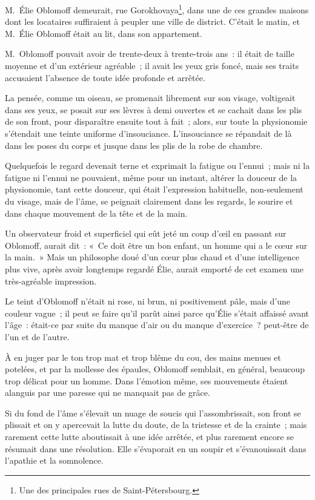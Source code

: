 \documentclass[french,twoside]{book} %
\begin{document}
\noindent M. Élie Oblomoff demeurait, rue Gorokhovaya\footnote{Une des principales rues de Saint-Pétersbourg.}, dans une de ces grandes maisons dont les locataires suffiraient à peupler une ville de district. C’était le matin, et M. Élie Oblomoff était au lit, dans son appartement.\par
M. Oblomoff pouvait avoir de trente-deux à trente-trois ans : il était de taille moyenne et d’un extérieur agréable ; il avait les yeux gris foncé, mais ses traits accusaient l’absence de toute idée profonde et arrêtée.\par
La pensée, comme un oiseau, se promenait librement sur son visage, voltigeait dans ses yeux, se posait sur ses lèvres à demi ouvertes et se cachait dans les plis de son front, pour disparaître ensuite tout à fait ; alors, sur toute la physionomie s’étendait une teinte uniforme d’insouciance. L’insouciance se répandait de là dans les poses du corps et jusque dans les plis de la robe de chambre.\par
Quelquefois le regard devenait terne et exprimait la fatigue ou l’ennui ; mais ni la fatigue ni l’ennui ne pouvaient, même pour un instant, altérer la douceur de la physionomie, tant cette douceur, qui était l’expression habituelle, non-seulement du visage, mais de l’âme, se peignait clairement dans les regards, le sourire et dans chaque mouvement de la tête et de la main.\par
Un observateur froid et superficiel qui eût jeté un coup d’œil en passant sur Oblomoff, aurait dit : « Ce doit être un bon enfant, un homme qui a le cœur sur la main. » Mais un philosophe doué d’un cœur plus chaud et d’une intelligence plus vive, après avoir longtemps regardé Élie, aurait emporté de cet examen une très-agréable impression.\par
Le teint d’Oblomoff n’était ni rose, ni brun, ni positivement pâle, mais d’une couleur vague ; il peut se faire qu’il parût ainsi parce qu’Élie s’était affaissé avant l’âge : était-ce par suite du manque d’air ou du manque d’exercice ? peut-être de l’un et de l’autre.\par
À en juger par le ton trop mat et trop blême du cou, des mains menues et potelées, et par la mollesse des épaules, Oblomoff semblait, en général, beaucoup trop délicat pour un homme. Dans l’émotion même, ses mouvements étaient alanguis par une paresse qui ne manquait pas de grâce.\par
Si du fond de l’âme s’élevait un nuage de soucis qui l’assombrissait, son front se plissait et on y apercevait la lutte du doute, de la tristesse et de la crainte ; mais rarement cette lutte aboutissait à une idée arrêtée, et plus rarement encore se résumait dans une résolution. Elle s’évaporait en un soupir et s’évanouissait dans l’apathie et la somnolence.\par
\end{document}
